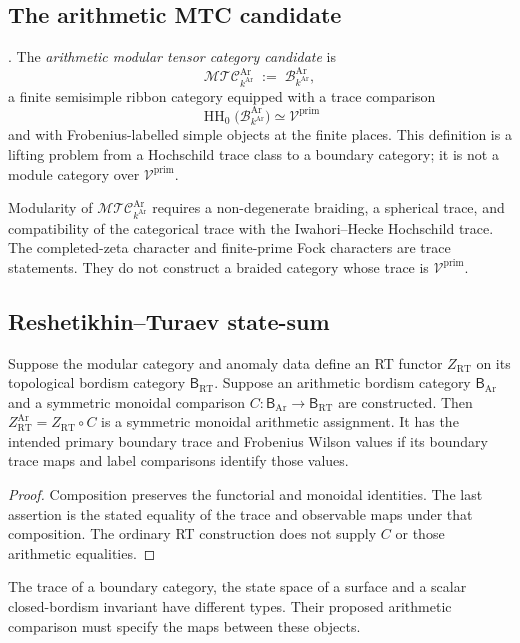 \subsection{The arithmetic MTC candidate}
\label{v4-arith:w10-a:arith-MTC}

\begin{definition}
\label{v4-arith:w10-a:def:arith-MTC}
\ClaimStatusDefinitional. The \emph{arithmetic modular tensor
category candidate} is
\[
\mathcal{MTC}^{\mathrm{Ar}}_{k^{\mathrm{Ar}}}
\;:=\;
\mathcal B^{\mathrm{Ar}}_{k^{\mathrm{Ar}}},
\]
a finite semisimple ribbon category equipped with a trace comparison
\[
        \operatorname{HH}_{0}
        \bigl(\mathcal B^{\mathrm{Ar}}_{k^{\mathrm{Ar}}}\bigr)
        \simeq
        \mathcal V^{\mathrm{prim}}
\]
and with Frobenius-labelled simple objects at the finite places. This
definition is a lifting problem from a Hochschild trace class to a
boundary category; it is not a module category over
\(\mathcal V^{\mathrm{prim}}\).
\end{definition}

\begin{remark}
\label{v4-arith:w10-a:rem:modularity-cond}
Modularity of \(\mathcal{MTC}^{\mathrm{Ar}}_{k^{\mathrm{Ar}}}\)
requires a non-degenerate braiding, a spherical trace, and compatibility
of the categorical trace with the Iwahori--Hecke Hochschild trace.
The completed-zeta character and finite-prime Fock characters are trace
statements. They do not construct a braided category whose trace is
\(\mathcal V^{\mathrm{prim}}\).
\end{remark}

\subsection{Reshetikhin--Turaev state-sum}
\label{v4-arith:w10-a:RT-state-sum}

\begin{theorem}
\label{v4-arith:w10-a:thm:RT-construction}
Suppose the modular category and anomaly data define an RT functor
$Z_{\mathrm{RT}}$ on its topological bordism category $\mathsf B_{\mathrm{RT}}$.
Suppose an arithmetic bordism category $\mathsf B_{\mathrm{Ar}}$ and a
symmetric monoidal comparison $C:\mathsf B_{\mathrm{Ar}}\to\mathsf B_{\mathrm{RT}}$
are constructed. Then
$Z_{\mathrm{RT}}^{\mathrm{Ar}}=Z_{\mathrm{RT}}\circ C$
is a symmetric monoidal arithmetic assignment.
It has the intended primary boundary trace and Frobenius Wilson values
if its boundary trace maps and label comparisons identify those values.
\end{theorem}
\begin{proof}
Composition preserves the functorial and monoidal identities.
The last assertion is the stated equality of the trace and observable
maps under that composition. The ordinary RT construction does not
supply $C$ or those arithmetic equalities.
\end{proof}
The trace of a boundary category, the state space of a surface and
a scalar closed-bordism invariant have different types. Their proposed
arithmetic comparison must specify the maps between these objects.

